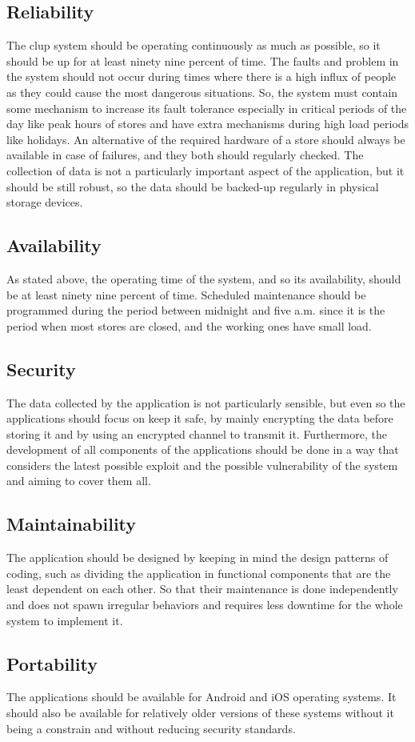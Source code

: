 \subsection{Reliability}
The \gls{clup} system should be operating continuously as much as possible, so it should be up for at least ninety nine percent of time. The faults and problem in the system should not occur during times where there is a high influx of people as they could cause the most dangerous situations. So, the system must contain some mechanism to increase its fault tolerance especially in critical periods of the day like peak hours of stores and have extra mechanisms during high load periods like holidays. An alternative of the required hardware of a store should always be available in case of failures, and they both should regularly checked. The collection of data is not a particularly important aspect of the application, but it should be still robust, so the data should be backed-up regularly in physical storage devices.

\subsection{Availability}
As stated above, the operating time of the system, and so its availability, should be at least ninety nine percent of time. Scheduled maintenance should be programmed during the period between midnight and five a.m. since it is the period when most stores are closed, and the working ones have small load.

\subsection{Security}
The data collected by the application is not particularly sensible, but even so the applications should focus on keep it safe, by mainly encrypting the data before storing it and by using an encrypted channel to transmit it. Furthermore, the development of all components of the applications should be done in a way that considers the latest possible exploit and the possible vulnerability of the system and aiming to cover them all.

\subsection{Maintainability}
The application should be designed by keeping in mind the design patterns of coding, such as dividing the application in functional components that are the least dependent on each other. So that their maintenance is done independently and does not spawn irregular behaviors and requires less downtime for the whole system to implement it.

\subsection{Portability}
The applications should be available for Android and iOS operating systems. It should also be available for relatively older versions of these systems without it being a constrain and without reducing security standards.

